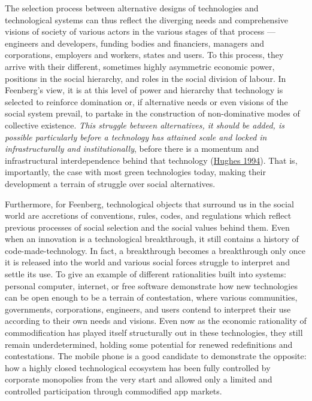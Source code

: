 \documentclass[a4paper, nobind]{templates/ociamthesis}
\begin{document}
The selection process between alternative designs of technologies and technological systems can thus reflect the diverging needs and comprehensive visions of society of various actors in the various stages of that process --- engineers and developers, funding bodies and financiers, managers and corporations, employers and workers, states and users. To this process, they arrive with their different, sometimes highly asymmetric economic power, positions in the social hierarchy, and roles in the social division of labour. In Feenberg's view, it is at this level of power and hierarchy that technology is selected to reinforce domination or, if alternative needs or even visions of the social system prevail, to partake in the construction of non-dominative modes of collective existence. \emph{This struggle between alternatives, it should be added, is possible particularly before a technology has attained scale and locked in infrastructurally and institutionally}, before there is a momentum and infrastructural interdependence behind that technology (\protect\hyperlink{ref-hughes_technological_1994}{Hughes 1994}). That is, importantly, the case with most green technologies today, making their development a terrain of struggle over social alternatives.

Furthermore, for Feenberg, technological objects that surround us in the social world are accretions of conventions, rules, codes, and regulations which reflect previous processes of social selection and the social values behind them. Even when an innovation is a technological breakthrough, it still contains a history of code-made-technology. In fact, a breakthrough becomes a breakthrough only once it is released into the world and various social forces struggle to interpret and settle its use. To give an example of different rationalities built into systems: personal computer, internet, or free software demonstrate how new technologies can be open enough to be a terrain of contestation, where various communities, governments, corporations, engineers, and users contend to interpret their use according to their own needs and visions. Even now as the economic rationality of commodification has played itself structurally out in these technologies, they still remain underdetermined, holding some potential for renewed redefinitions and contestations. The mobile phone is a good candidate to demonstrate the opposite: how a highly closed technological ecosystem has been fully controlled by corporate monopolies from the very start and allowed only a limited and controlled participation through commodified app markets.
\end{document}
